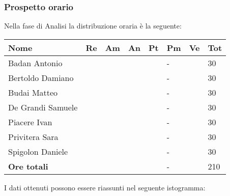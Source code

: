 \subsubsection{Prospetto orario}
Nella fase di Analisi la distribuzione oraria è la seguente:
\begin{center}
	\begin{longtable}{|p{}|p{}|p{}|p{}|p{}|p{}|p{}|p{}|}
		\hline
		\rowcolor{lighter-grayer}
		\centering\textbf{Nome} & \centering\textbf{Re} & \centering\textbf{Am} & \centering\textbf{An} &  \centering\textbf{Pt}&  \centering\textbf{Pm}&  \centering\textbf{Ve} & \textbf{Tot}\\
		\hline
		\endfirsthead
		
		\hline
		\centering Badan Antonio & \centering & \centering & \centering & \centering & \centering - & \centering & 30 \\
		\hline
		\centering Bertoldo Damiano & \centering & \centering & \centering & \centering & \centering - & \centering & 30 \\
		\hline
		\centering Budai Matteo & \centering & \centering & \centering & \centering & \centering - & \centering & 30 \\
		\hline
		\centering De Grandi Samuele & \centering & \centering & \centering & \centering & \centering - & \centering & 30 \\
		 \hline
		\centering Piacere Ivan & \centering & \centering & \centering & \centering & \centering - & \centering & 30 \\
		 \hline
		\centering Privitera Sara & \centering & \centering & \centering & \centering & \centering - & \centering & 30 \\
		 \hline
		\centering Spigolon Daniele & \centering & \centering & \centering & \centering & \centering - & \centering & 30 \\
		 \hline
		\centering\textbf{Ore totali}  & \centering & \centering & \centering & \centering & \centering - & \centering & 210 \\
		\hline
		
	\end{longtable}
\end{center}

I dati ottenuti possono essere riassunti nel seguente istogramma:
\\

